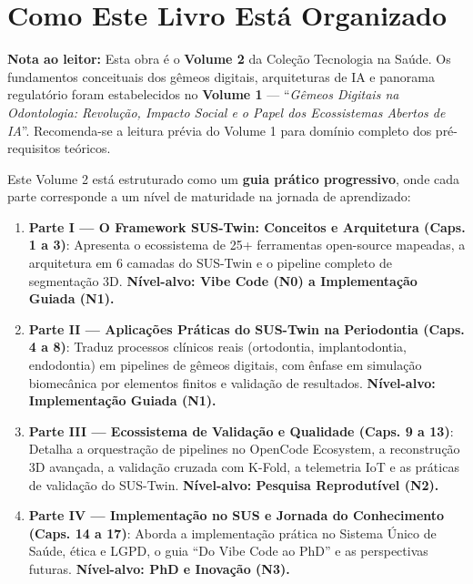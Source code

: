 \section{Como Este Livro Está Organizado}

\noindent\textbf{Nota ao leitor:} Esta obra é o \textbf{Volume 2} da Coleção Tecnologia na Saúde. Os fundamentos conceituais dos gêmeos digitais, arquiteturas de IA e panorama regulatório foram estabelecidos no \textbf{Volume 1} --- ``\textit{Gêmeos Digitais na Odontologia: Revolução, Impacto Social e o Papel dos Ecossistemas Abertos de IA}''. Recomenda-se a leitura prévia do Volume 1 para domínio completo dos pré-requisitos teóricos.

\vspace{0.3cm}

Este Volume 2 está estruturado como um \textbf{guia prático progressivo}, onde cada parte corresponde a um nível de maturidade na jornada de aprendizado:

\begin{enumerate}
    \item \textbf{Parte I --- O Framework SUS-Twin: Conceitos e Arquitetura (Caps. 1 a 3)}: Apresenta o ecossistema de 25+ ferramentas open-source mapeadas, a arquitetura em 6 camadas do SUS-Twin e o pipeline completo de segmentação 3D. \textbf{Nível-alvo: Vibe Code (N0) a Implementação Guiada (N1).}
    
    \item \textbf{Parte II --- Aplicações Práticas do SUS-Twin na Periodontia (Caps. 4 a 8)}: Traduz processos clínicos reais (ortodontia, implantodontia, endodontia) em pipelines de gêmeos digitais, com ênfase em simulação biomecânica por elementos finitos e validação de resultados. \textbf{Nível-alvo: Implementação Guiada (N1).}
    
    \item \textbf{Parte III --- Ecossistema de Validação e Qualidade (Caps. 9 a 13)}: Detalha a orquestração de pipelines no OpenCode Ecosystem, a reconstrução 3D avançada, a validação cruzada com K-Fold, a telemetria IoT e as práticas de validação do SUS-Twin. \textbf{Nível-alvo: Pesquisa Reprodutível (N2).}
    
    \item \textbf{Parte IV --- Implementação no SUS e Jornada do Conhecimento (Caps. 14 a 17)}: Aborda a implementação prática no Sistema Único de Saúde, ética e LGPD, o guia ``Do Vibe Code ao PhD'' e as perspectivas futuras. \textbf{Nível-alvo: PhD e Inovação (N3).}
\end{enumerate}

